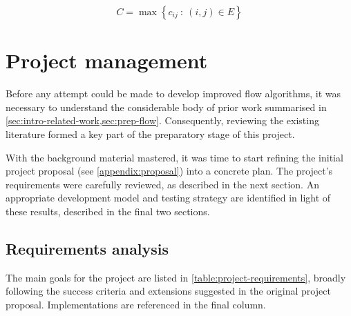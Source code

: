 \begin{equation}
C=\max\left\{ c_{ij}\::\:(i,j)\in E\right\} 
\end{equation}

\section{Project management}

Before any attempt could be made to develop improved flow algorithms, it was necessary to understand the considerable body of prior work  summarised in \cref{sec:intro-related-work,sec:prep-flow}. Consequently, reviewing the existing literature formed a key part of the preparatory stage of this project. 

With the background material mastered, it was time to start refining the initial project proposal (see \cref{appendix:proposal}) into a concrete plan. The project's requirements were carefully reviewed, as described in the next section. An appropriate development model and testing strategy are identified in light of these results, described in the final two sections.

\subsection{Requirements analysis} \label{sec:prep-management-requirements}



The main goals for the project are listed in \cref{table:project-requirements}, broadly following the success criteria and extensions suggested in the original project proposal. Implementations are referenced in the final column.


